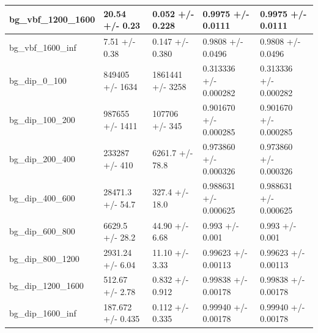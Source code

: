 \documentclass[a4paper, 10pt]{article}
\begin{document}
\begin{table}[H]
\begin{center}
\begin{tabular}{|m{20.0mm}|m{27.0mm}|m{27.0mm}|m{33.0mm}|m{32.0mm}|}
      \hline
      {\cellcolor{white}         bg\_vbf\_1200\_1600}& {\cellcolor{white}         20.54 +/\-- 0.23}& {\cellcolor{white}         0.052 +/\-- 0.228}& {\cellcolor{white}         0.9975 +/\-- 0.0111}& {\cellcolor{white}         0.9975 +/\-- 0.0111}\\
      \hline
      {\cellcolor{white}         bg\_vbf\_1600\_inf}& {\cellcolor{white}         7.51 +/\-- 0.38}& {\cellcolor{white}         0.147 +/\-- 0.380}& {\cellcolor{white}         0.9808 +/\-- 0.0496}& {\cellcolor{white}         0.9808 +/\-- 0.0496}\\
      \hline
      {\cellcolor{white}         bg\_dip\_0\_100}& {\cellcolor{white}         849405 +/\-- 1634}& {\cellcolor{white}         1861441 +/\-- 3258}& {\cellcolor{white}         0.313336 +/\-- 0.000282}& {\cellcolor{white}         0.313336 +/\-- 0.000282}\\
      \hline
      {\cellcolor{white}         bg\_dip\_100\_200}& {\cellcolor{white}         987655 +/\-- 1411}& {\cellcolor{white}         107706 +/\-- 345}& {\cellcolor{white}         0.901670 +/\-- 0.000285}& {\cellcolor{white}         0.901670 +/\-- 0.000285}\\
      \hline
      {\cellcolor{white}         bg\_dip\_200\_400}& {\cellcolor{white}         233287 +/\-- 410}& {\cellcolor{white}         6261.7 +/\-- 78.8}& {\cellcolor{white}         0.973860 +/\-- 0.000326}& {\cellcolor{white}         0.973860 +/\-- 0.000326}\\
      \hline
      {\cellcolor{white}         bg\_dip\_400\_600}& {\cellcolor{white}         28471.3 +/\-- 54.7}& {\cellcolor{white}         327.4 +/\-- 18.0}& {\cellcolor{white}         0.988631 +/\-- 0.000625}& {\cellcolor{white}         0.988631 +/\-- 0.000625}\\
      \hline
      {\cellcolor{white}         bg\_dip\_600\_800}& {\cellcolor{white}         6629.5 +/\-- 28.2}& {\cellcolor{white}         44.90 +/\-- 6.68}& {\cellcolor{white}         0.993 +/\-- 0.001}& {\cellcolor{white}         0.993 +/\-- 0.001}\\
      \hline
      {\cellcolor{white}         bg\_dip\_800\_1200}& {\cellcolor{white}         2931.24 +/\-- 6.04}& {\cellcolor{white}         11.10 +/\-- 3.33}& {\cellcolor{white}         0.99623 +/\-- 0.00113}& {\cellcolor{white}         0.99623 +/\-- 0.00113}\\
      \hline
      {\cellcolor{white}         bg\_dip\_1200\_1600}& {\cellcolor{white}         512.67 +/\-- 2.78}& {\cellcolor{white}         0.832 +/\-- 0.912}& {\cellcolor{white}         0.99838 +/\-- 0.00178}& {\cellcolor{white}         0.99838 +/\-- 0.00178}\\
      \hline
      {\cellcolor{white}         bg\_dip\_1600\_inf}& {\cellcolor{white}         187.672 +/\-- 0.435}& {\cellcolor{white}         0.112 +/\-- 0.335}& {\cellcolor{white}         0.99940 +/\-- 0.00178}& {\cellcolor{white}         0.99940 +/\-- 0.00178}\\
\hline
    \end{tabular}
  \end{center}
\end{table}
\end{document}
